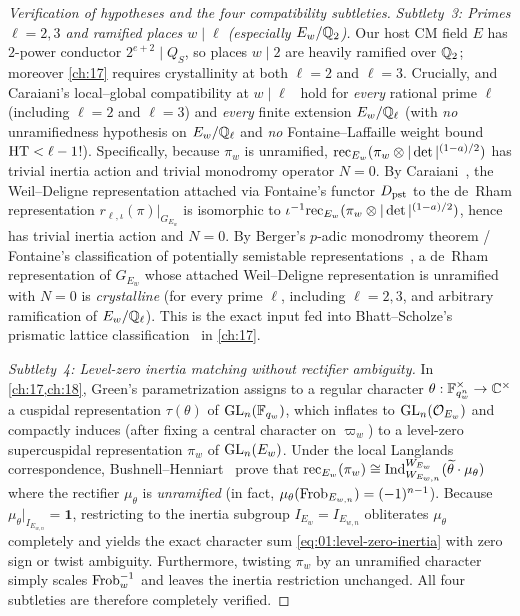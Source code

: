 \begin{proof}[Verification of hypotheses and the four compatibility subtleties]
\medskip\noindent
\emph{Subtlety~3: Primes $\ell = 2, 3$ and ramified places $w \mid \ell$ (especially $E_w / \mathbb{Q}_2$).}
Our host CM field $E$ has $2$-power conductor $2^{e+2} \mid Q_S$, so places $w \mid 2$ are heavily ramified over $\mathbb{Q}_2$; moreover \cref{ch:17} requires crystallinity at both $\ell = 2$ and $\ell = 3$. Crucially, \cite[Theorem~2.1.1]{BLGGT2014} and Caraiani's local--global compatibility at $w \mid \ell$~\cite[Theorem~1.1]{Caraiani2014} hold for \emph{every} rational prime $\ell$ (including $\ell = 2$ and $\ell = 3$) and \emph{every} finite extension $E_w / \mathbb{Q}_\ell$ (with \emph{no} unramifiedness hypothesis on $E_w/\mathbb{Q}_\ell$ and \emph{no} Fontaine--Laffaille weight bound $\mathrm{HT} < \ell - 1$!). Specifically, because $\pi_w$ is unramified, $\mathrm{rec}_{E_w}(\pi_w \otimes |\det|^{(1-a)/2})$ has trivial inertia action and trivial monodromy operator $N = 0$. By Caraiani~\cite[Theorem~1.1]{Caraiani2014}, the Weil--Deligne representation attached via Fontaine's functor $D_{\mathrm{pst}}$ to the de~Rham representation $r_{\ell,\iota}(\pi)|_{G_{E_w}}$ is isomorphic to $\iota^{-1}\mathrm{rec}_{E_w}(\pi_w \otimes |\det|^{(1-a)/2})$, hence has trivial inertia action and $N = 0$. By Berger's $p$-adic monodromy theorem / Fontaine's classification of potentially semistable representations~\cite{Fontaine1994}, a de~Rham representation of $G_{E_w}$ whose attached Weil--Deligne representation is unramified with $N = 0$ is \emph{crystalline} (for every prime $\ell$, including $\ell = 2, 3$, and arbitrary ramification of $E_w/\mathbb{Q}_\ell$). This is the exact input fed into Bhatt--Scholze's prismatic lattice classification~\cite{BhattScholze2023} in \cref{ch:17}.

\medskip\noindent
\emph{Subtlety~4: Level-zero inertia matching without rectifier ambiguity.}
In \cref{ch:17,ch:18}, Green's parametrization assigns to a regular character $\theta : \mathbb{F}_{q_w^n}^\times \to \mathbb{C}^\times$ a cuspidal representation $\tau(\theta)$ of $\mathrm{GL}_n(\mathbb{F}_{q_w})$, which inflates to $\mathrm{GL}_n(\mathcal{O}_{E_w})$ and compactly induces (after fixing a central character on $\varpi_w$) to a level-zero supercuspidal representation $\pi_w$ of $\mathrm{GL}_n(E_w)$. Under the local Langlands correspondence, Bushnell--Henniart~\cite[Theorem~2.1]{BushnellHenniart2005} prove that $\mathrm{rec}_{E_w}(\pi_w) \cong \mathrm{Ind}_{W_{E_{w,n}}}^{W_{E_w}}(\widetilde{\theta}\cdot \mu_\theta)$ where the rectifier $\mu_\theta$ is \emph{unramified} (in fact, $\mu_\theta(\mathrm{Frob}_{E_{w,n}}) = (-1)^{n-1}$). Because $\mu_\theta|_{I_{E_{w,n}}} = \mathbf{1}$, restricting to the inertia subgroup $I_{E_w} = I_{E_{w,n}}$ obliterates $\mu_\theta$ completely and yields the exact character sum \eqref{eq:01:level-zero-inertia} with zero sign or twist ambiguity. Furthermore, twisting $\pi_w$ by an unramified character simply scales $\mathrm{Frob}_w^{-1}$ and leaves the inertia restriction unchanged. All four subtleties are therefore completely verified.
\end{proof}

